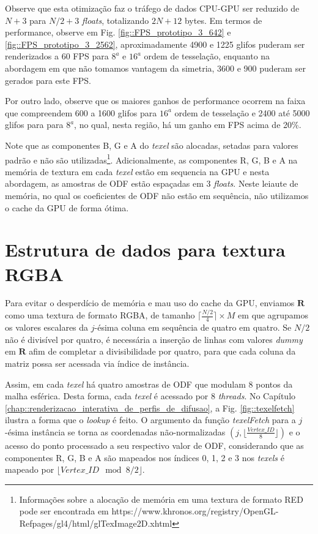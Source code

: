 \documentclass[
    12pt,                %
    oneside,            %
    a4paper,            %
    english,            %
    french,                %
    spanish,            %
    brazil                %
    ]{abntex2}
\begin{document}
Observe que esta otimização faz o tráfego de dados CPU-GPU ser reduzido de $N + 3$ para $N/2 + 3$ \textit{floats}, totalizando $2N + 12$ bytes. Em termos de performance, observe em Fig. \ref{fig::FPS_prototipo_3_642} e \ref{fig::FPS_prototipo_3_2562}, aproximadamente 4900 e 1225 glifos puderam ser renderizados a 60 FPS para $8^a$ e $16^a$ ordem de tesselação, enquanto na abordagem em que não tomamos vantagem da simetria, 3600 e 900 puderam ser gerados para este FPS.

Por outro lado, observe que os maiores ganhos de performance ocorrem na faixa que compreendem 600 a 1600 glifos para $16^a$ ordem de tesselação e 2400 até 5000 glifos para para $8^a$, no qual, nesta região, há um ganho em FPS acima de 20\%.

Note que as componentes B, G e A do \textit{texel} são alocadas, setadas para valores padrão e não são utilizadas\footnote{Informações sobre a alocação de memória em uma textura de formato RED pode ser encontrada em https://www.khronos.org/registry/OpenGL-Refpages/gl4/html/glTexImage2D.xhtml}. Adicionalmente, as componentes R, G, B e A na memória de textura em cada \textit{texel} estão em sequencia na GPU e nesta abordagem, as amostras de ODF estão espaçadas em 3 \textit{floats}. Neste leiaute de memória, no qual os coeficientes de ODF não estão em sequência, não utilizamos o cache da GPU de forma ótima.



\section{Estrutura de dados para textura RGBA}
\label{sec::estrutura_de_dados_para_textura_RGBA}

Para evitar o desperdício de memória e mau uso do cache da GPU, enviamos $\mathbf{R}$ como uma textura de formato RGBA, de tamanho $\lceil \frac{N/2}{4}\rceil \times M$ em que agrupamos os valores escalares da $j$-ésima coluna em sequência de quatro em quatro. Se $N/2$ não é divisível por quatro, é necessária a inserção de linhas com valores \textit{dummy} em $\mathbf{R}$ afim de completar a divisibilidade por quatro, para que cada coluna da matriz possa ser acessada via índice de instância.

Assim, em cada \textit{texel} há quatro amostras de ODF que modulam 8 pontos da malha esférica. Desta forma, cada \textit{texel} é acessado por 8 \textit{threads}. No Capítulo \ref{chap::renderizacao_interativa_de_perfis_de_difusao}, a Fig. \ref{fig::texelfetch} ilustra a forma que o \textit{lookup} é feito. O argumento da função \textit{texelFetch} para a $j$-ésima instância se torna as coordenadas não-normalizadas $(j, \lfloor \frac{Vertex\_ID}{8} \rfloor)$ e o acesso do ponto processado a seu respectivo valor de ODF, considerando que as componentes R, G, B e A são mapeados nos índices 0, 1, 2 e 3 nos \textit{texels} é mapeado por $\lfloor Vertex\_ID \mod{8}/2 \rfloor$.
\end{document}
